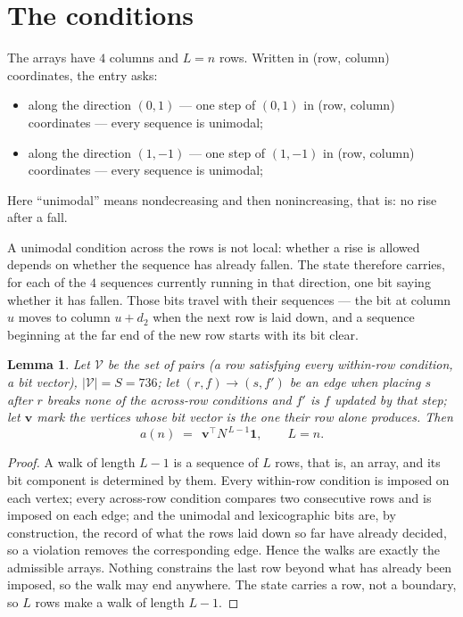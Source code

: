 \documentclass[11pt,a4paper]{article}
\theoremstyle{plain}
\newtheorem{lemma}[theorem]{Lemma}
\theoremstyle{definition}
\begin{document}
\section{The conditions}

The arrays have $4$ columns and $L=n$ rows. Written in (row, column)
coordinates, the entry asks:
\begin{itemize}
\item along the direction $(0,1)$ --- one step of $(0,1)$ in (row, column) coordinates --- every sequence is unimodal;
\item along the direction $(1,-1)$ --- one step of $(1,-1)$ in (row, column) coordinates --- every sequence is unimodal;
\end{itemize}
Here ``unimodal'' means nondecreasing and then nonincreasing, that is: no rise after a fall.

A unimodal condition across the rows is not local: whether a
rise is allowed depends on whether the sequence has already fallen. The state therefore
carries, for each of the $4$ sequences currently running in that direction, one bit saying
whether it has fallen. Those bits travel with their sequences --- the bit at column $u$
moves to column $u+d_2$ when the next row is laid down, and a sequence beginning at the
far end of the new row starts with its bit clear.

\begin{lemma}\label{lem:walk}
Let $\mathcal V$ be the set of pairs (a row satisfying every within-row condition, a
bit vector), $|\mathcal V|=S=736$; let $(r,f)\to(s,f')$ be an edge when placing $s$ after $r$
breaks none of the across-row conditions and $f'$ is $f$ updated by that step; let
$\mathbf{v}$ mark the vertices whose bit vector is the one their row alone produces.
Then
\[
a(n)\;=\;\,\mathbf{v}^{\!\top}N^{\,L-1}\mathbf{1},\qquad L=n.
\]
\end{lemma}

\begin{proof}
A walk of length $L-1$ is a sequence of $L$ rows, that is, an array, and its bit component
is determined by them. Every within-row condition is imposed on each vertex; every
across-row condition compares two consecutive rows and is imposed on each edge; and the
unimodal and lexicographic bits are, by construction, the record of what the rows laid down
so far have already decided, so a violation removes the corresponding edge. Hence the walks
are exactly the admissible arrays. Nothing constrains the last row beyond what has already
been imposed, so the walk may end anywhere. The state carries a row, not a boundary, so
$L$ rows make a walk of length $L-1$.
\end{proof}
\end{document}
